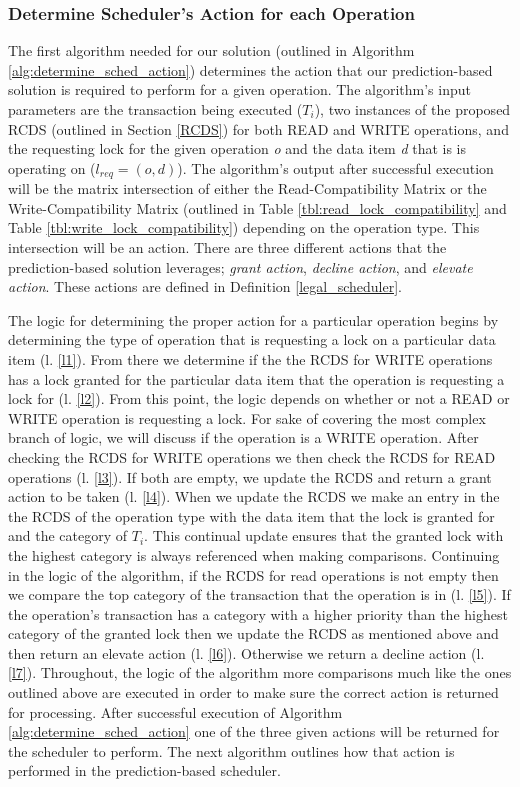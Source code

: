 \documentclass[conference]{IEEEtran}
\begin{document}
\subsubsection{Determine Scheduler's Action for each Operation}
The first algorithm needed for our solution (outlined in Algorithm \ref{alg:determine_sched_action}) determines the action that our prediction-based solution is required to perform for a given operation. The algorithm's input parameters are the transaction being executed ($T_{i}$), two instances of the proposed RCDS (outlined in Section \ref{RCDS}) for both READ and WRITE operations, and the requesting lock for the given operation \textit{o} and the data item \textit{d} that is is operating on ($l_{req} = (o,d)$). The algorithm's output after successful execution will be the matrix intersection of either the Read-Compatibility Matrix or the Write-Compatibility Matrix (outlined in Table \ref{tbl:read_lock_compatibility} and Table \ref{tbl:write_lock_compatibility}) depending on the operation type. This intersection will be an action. There are three different actions that the prediction-based solution leverages; \textit{grant action}, \textit{decline action}, and \textit{elevate action}. These actions are defined in Definition \ref{legal_scheduler}.

The logic for determining the proper action for a particular operation begins by determining the type of operation that is requesting a lock on a particular data item (l. \ref{l1}). From there we determine if the the RCDS for WRITE operations has a lock granted for the particular data item that the operation is requesting a lock for (l. \ref{l2}). From this point, the logic depends on whether or not a READ or WRITE operation is requesting a lock. For sake of covering the most complex branch of logic, we will discuss if the operation is a WRITE operation. After checking the RCDS for WRITE operations we then check the RCDS for READ operations (l. \ref{l3}). If both are empty, we update the RCDS and return a grant action to be taken (l. \ref{l4}). When we update the RCDS we make an entry in the the RCDS of the operation type with the data item that the lock is granted for and the category of $T_{i}$. This continual update ensures that the granted lock with the highest category is always referenced when making comparisons. Continuing in the logic of the algorithm, if the RCDS for read operations is not empty then we compare the top category of the transaction that the operation is in (l. \ref{l5}). If the operation's transaction has a category with a higher priority than the highest category of the granted lock then we update the RCDS as mentioned above and then return an elevate action (l. \ref{l6}). Otherwise we return a decline action (l. \ref{l7}). Throughout, the logic of the algorithm more comparisons much like the ones outlined above are executed in order to make sure the correct action is returned for processing. After successful execution of Algorithm \ref{alg:determine_sched_action} one of the three given actions will be returned for the scheduler to perform. The next algorithm outlines how that action is performed in the prediction-based scheduler.
\end{document}
